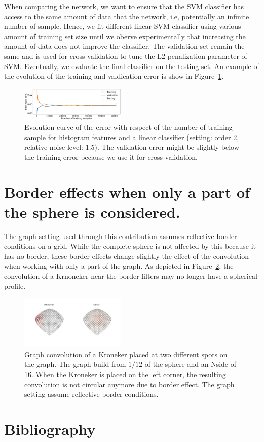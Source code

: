 \documentclass[final,twocolumn,3p,times,authoryear]{elsarticle}
\newcommand{\figref}[1]{Figure~\ref{fig:#1}}
\newcommand{\1}{\b{1}}              %
\newcommand{\0}{\b{0}}              %
\begin{document}
When comparing the network, we want to ensure that the SVM classifier has
access to the same amount of data that the network, i.e, potentially an
infinite number of sample. Hence, we fit different linear SVM classifier using
various amount of training set size until we oberve experimentally that
increasing the amount of data does not improve the classifier. The validation
set remain the same and is used for cross-validation to tune the L2
penalization parameter of SVM. Eventually, we evaluate the final classifier on
the testing set. An example of the evolution of the training and valdication
error is show in \figref{hist_error_evolution}.

\begin{figure}[!ht]
\centering
\includegraphics[width=0.45\textwidth]{figures/hist_error_order2_noise1_5.pdf}
\caption{Evolution curve of the error with respect of the number of training sample for histogram features and a linear classifier (setting: order 2, relative noise level: 1.5). The validation error might be slightly below the training error because we use it for cross-validation.}
\label{fig:hist_error_evolution}
\end{figure}

\section{Border effects when only a part of the sphere is considered.}
\label{sec:border_effects}
The graph setting used through this contribution assumes reflective border conditions on a grid. While the complete sphere is not affected by this because it has no border, these border effects change slightly the effect of the convolution when working with only a part of the graph.  As depicted in \figref{border_effects}, the convolution of a Krnoneker near the border filters may no longer have a spherical profile. 

\begin{figure}[!ht]
\centering
\includegraphics[width=0.45\textwidth]{figures/border_effects.pdf}
\caption{Graph convolution of a Kroneker placed at two different spots on the graph. The graph build from $1/12$ of the sphere and an Nside of 16. When the Kroneker is placed on the left corner, the resulting convolution is not circular anymore due to border effect. The graph setting assume reflective border conditions.}
\label{fig:border_effects}
\end{figure}

\section*{Bibliography}


\end{document}
